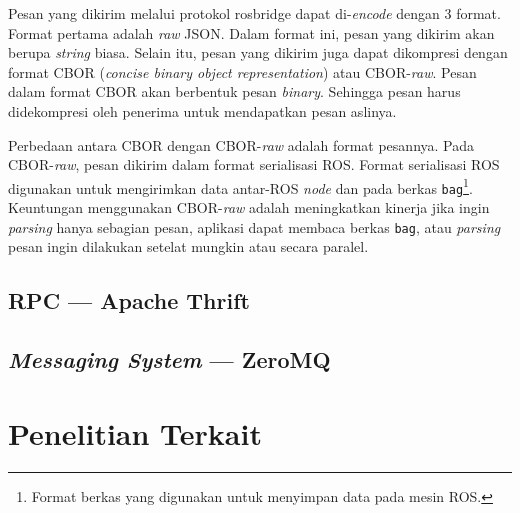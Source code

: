 Pesan yang dikirim melalui protokol rosbridge dapat di-\textit{encode} dengan 3
format. Format pertama adalah \textit{raw} JSON. Dalam format ini, pesan yang
dikirim akan berupa \textit{string} biasa. Selain itu, pesan yang dikirim juga
dapat dikompresi dengan format CBOR (\textit{concise binary object
      representation}) atau CBOR-\textit{raw}. Pesan dalam format CBOR akan berbentuk
pesan \textit{binary}. Sehingga pesan harus didekompresi oleh penerima untuk
mendapatkan pesan aslinya.

Perbedaan antara CBOR dengan CBOR-\textit{raw} adalah format pesannya. Pada
CBOR-\textit{raw}, pesan dikirim dalam format serialisasi ROS. Format
serialisasi ROS digunakan untuk mengirimkan data antar-ROS \textit{node} dan
pada berkas \texttt{bag}\footnote{Format berkas yang digunakan untuk menyimpan
      data pada mesin ROS.}. Keuntungan menggunakan CBOR-\textit{raw} adalah
meningkatkan kinerja jika ingin \textit{parsing} hanya sebagian pesan, aplikasi
dapat membaca berkas \texttt{bag}, atau \textit{parsing} pesan ingin dilakukan
setelat mungkin atau secara paralel.

\subsection{RPC --- Apache Thrift}
\subsection{\textit{Messaging System} --- ZeroMQ}

\section{Penelitian Terkait}
\blindtext